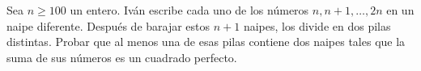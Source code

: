 Sea $n \geq 100$ un entero. Iván escribe cada uno de los números $n,n+1,\dots,2n$ en un naipe diferente. Después de barajar estos $n + 1$ naipes, los divide en dos pilas distintas. Probar que al menos una de esas pilas contiene dos naipes tales que la suma de sus números es un cuadrado perfecto.